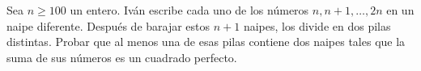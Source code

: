 Sea $n \geq 100$ un entero. Iván escribe cada uno de los números $n,n+1,\dots,2n$ en un naipe diferente. Después de barajar estos $n + 1$ naipes, los divide en dos pilas distintas. Probar que al menos una de esas pilas contiene dos naipes tales que la suma de sus números es un cuadrado perfecto.